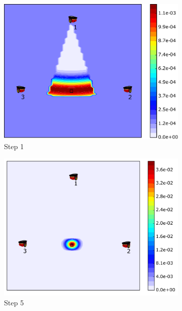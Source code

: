 \documentclass[journal]{IEEEtranTIE}
\theoremstyle{remark}
\begin{document}
	
	\begin{figure}
		\centering
		\begin{subfigure}[b]{0.21\textwidth}
			\includegraphics[width=\textwidth]{sonar_mov_sen_sta_tar_rbt1_step1_16-TIE-3798}
			\caption{Step 1}\label{fig:sonar_mov_sen_sta_tar_rbt1_step1}
		\end{subfigure}
		\begin{subfigure}[b]{0.21\textwidth}
			\includegraphics[width=\textwidth]{sonar_mov_sen_sta_tar_rbt1_step5_16-TIE-3798}
			\caption{Step 5}\label{fig:sonar_mov_sen_sta_tar_rbt1_step5}
		\end{subfigure}	
		\begin{subfigure}[b]{0.21\textwidth}

\end{subfigure}
\end{figure}
\end{document}
